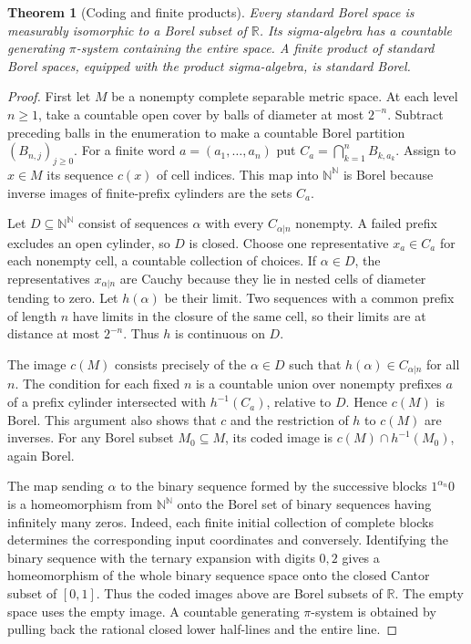 \documentclass[11pt,oneside,openany]{book}
\theoremstyle{plain}
\newtheorem{theorem}{Theorem}[chapter]
\theoremstyle{definition}
\theoremstyle{remark}
\begin{document}
\begin{theorem}[Coding and finite products]\label{thm:standard-borel-coding}
Every standard Borel space is measurably isomorphic to a Borel subset of \(\mathbb R\). Its sigma-algebra has a countable generating \(\pi\)-system containing the entire space. A finite product of standard Borel spaces, equipped with the product sigma-algebra, is standard Borel.
\end{theorem}
\begin{proof}
First let \(M\) be a nonempty complete separable metric space. At each level \(n\ge1\), take a countable open cover by balls of diameter at most \(2^{-n}\). Subtract preceding balls in the enumeration to make a countable Borel partition \((B_{n,j})_{j\ge0}\). For a finite word \(a=(a_1,\ldots,a_n)\) put \(C_a=\bigcap_{k=1}^n B_{k,a_k}\). Assign to \(x\in M\) its sequence \(c(x)\) of cell indices. This map into \(\mathbb N^{\mathbb N}\) is Borel because inverse images of finite-prefix cylinders are the sets \(C_a\).

Let \(D\subseteq\mathbb N^{\mathbb N}\) consist of sequences \(\alpha\) with every \(C_{\alpha|n}\) nonempty. A failed prefix excludes an open cylinder, so \(D\) is closed. Choose one representative \(x_a\in C_a\) for each nonempty cell, a countable collection of choices. If \(\alpha\in D\), the representatives \(x_{\alpha|n}\) are Cauchy because they lie in nested cells of diameter tending to zero. Let \(h(\alpha)\) be their limit. Two sequences with a common prefix of length \(n\) have limits in the closure of the same cell, so their limits are at distance at most \(2^{-n}\). Thus \(h\) is continuous on \(D\).

The image \(c(M)\) consists precisely of the \(\alpha\in D\) such that \(h(\alpha)\in C_{\alpha|n}\) for all \(n\). The condition for each fixed \(n\) is a countable union over nonempty prefixes \(a\) of a prefix cylinder intersected with \(h^{-1}(C_a)\), relative to \(D\). Hence \(c(M)\) is Borel. This argument also shows that \(c\) and the restriction of \(h\) to \(c(M)\) are inverses. For any Borel subset \(M_0\subseteq M\), its coded image is \(c(M)\cap h^{-1}(M_0)\), again Borel.

The map sending \(\alpha\) to the binary sequence formed by the successive blocks \(1^{\alpha_n}0\) is a homeomorphism from \(\mathbb N^{\mathbb N}\) onto the Borel set of binary sequences having infinitely many zeros. Indeed, each finite initial collection of complete blocks determines the corresponding input coordinates and conversely. Identifying the binary sequence with the ternary expansion with digits \(0,2\) gives a homeomorphism of the whole binary sequence space onto the closed Cantor subset of \([0,1]\). Thus the coded images above are Borel subsets of \(\mathbb R\). The empty space uses the empty image. A countable generating \(\pi\)-system is obtained by pulling back the rational closed lower half-lines and the entire line.


\end{proof}
\end{document}
